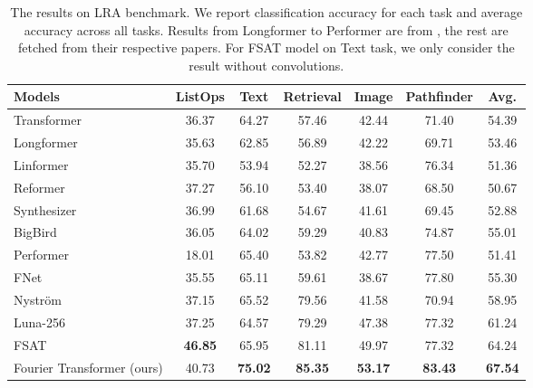 \documentclass[11pt]{article}
\begin{document}
\begin{table*}[ht]
\centering
\begin{tabular}{@{}lccccc | c@{}}
\toprule
\textbf{Models} & \textbf{ListOps} & \textbf{Text} & \textbf{Retrieval} & \textbf{Image} & \textbf{Pathfinder} & \textbf{Avg.} \\ \midrule
Transformer \citep{vaswani2017attention}           & 36.37 & 64.27 & 57.46 & 42.44 & 71.40 & 54.39 \\ Longformer \citep{beltagy2020longformer}            & 35.63 & 62.85 & 56.89 & 42.22 & 69.71 & 53.46 \\ Linformer \citep{wang2020linformer}             & 35.70 & 53.94 & 52.27 & 38.56 & 76.34 & 51.36 \\ Reformer \citep{kitaev2020reformer}              & 37.27 & 56.10 & 53.40 & 38.07 & 68.50 & 50.67 \\ Synthesizer \citep{tay2021synthesizer}           & 36.99 & 61.68 & 54.67 & 41.61 & 69.45 & 52.88 \\ BigBird \citep{zaheer2020big}               & 36.05 & 64.02 & 59.29 & 40.83 & 74.87 & 55.01 \\ Performer \citep{choromanski2020masked}             & 18.01 & 65.40 & 53.82 & 42.77 & 77.50 & 51.41 \\ FNet \citep{lee2021fnet}                  & 35.55 & 65.11 & 59.61 & 38.67 & 77.80 & 55.30 \\ Nystr\"{o}m \citep{xiong2021nystromformer}               & 37.15 & 65.52 & 79.56 & 41.58 & 70.94 & 58.95 \\ Luna-256 \citep{ma2021luna}              & 37.25 & 64.57 & 79.29 & 47.38 & 77.32 & 61.24 \\ FSAT \citep{zhuang2022long}                  & \textbf{46.85} & 65.95 & 81.11 & 49.97 & 77.32 & 64.24 \\ \midrule
Fourier Transformer (ours) &   40.73    &   \textbf{75.02}    &   \textbf{85.35}    &   \textbf{53.17}    &    \textbf{83.43}   &  \textbf{67.54}     \\ \bottomrule
\end{tabular}
\caption{The results on LRA benchmark. We report classification accuracy for each task and average accuracy across all tasks. Results from Longformer to Performer are from \citet{tay2020long}, the rest are fetched from their respective papers. For FSAT model on Text task, we only consider the result without convolutions.}
\label{tab: lra}
\end{table*}
\end{document}
